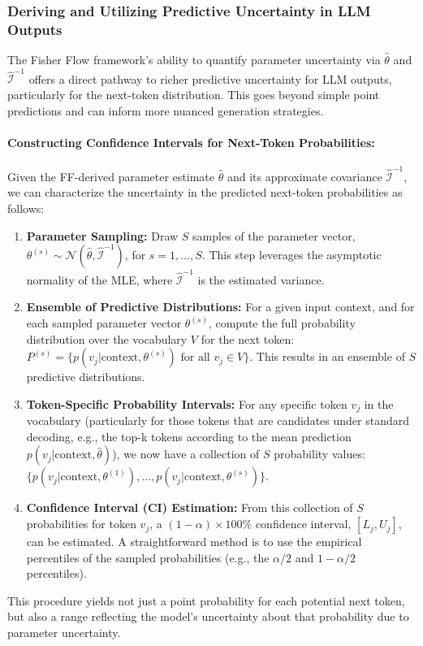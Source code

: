 \documentclass[11pt]{article}
\begin{document}
\subsubsection{Deriving and Utilizing Predictive Uncertainty in LLM Outputs}

The Fisher Flow framework's ability to quantify parameter uncertainty via $\hat{\theta}$ and $\hat{\mathcal{I}}^{-1}$ offers a direct pathway to richer predictive uncertainty for LLM outputs, particularly for the next-token distribution. This goes beyond simple point predictions and can inform more nuanced generation strategies.

\paragraph{Constructing Confidence Intervals for Next-Token Probabilities:}
Given the FF-derived parameter estimate $\hat{\theta}$ and its approximate covariance $\hat{\mathcal{I}}^{-1}$, we can characterize the uncertainty in the predicted next-token probabilities as follows:
\begin{enumerate}
    \item \textbf{Parameter Sampling:} Draw $S$ samples of the parameter vector, $\theta^{(s)} \sim \mathcal{N}(\hat{\theta}, \hat{\mathcal{I}}^{-1})$, for $s=1, \ldots, S$. This step leverages the asymptotic normality of the MLE, where $\hat{\mathcal{I}}^{-1}$ is the estimated variance.
    \item \textbf{Ensemble of Predictive Distributions:} For a given input context, and for each sampled parameter vector $\theta^{(s)}$, compute the full probability distribution over the vocabulary $V$ for the next token: $P^{(s)} = \{p(v_j | \text{context}, \theta^{(s)}) \text{ for all } v_j \in V\}$. This results in an ensemble of $S$ predictive distributions.
    \item \textbf{Token-Specific Probability Intervals:} For any specific token $v_j$ in the vocabulary (particularly for those tokens that are candidates under standard decoding, e.g., the top-k tokens according to the mean prediction $p(v_j | \text{context}, \hat{\theta})$), we now have a collection of $S$ probability values: $\{p(v_j | \text{context}, \theta^{(1)}), \ldots, p(v_j | \text{context}, \theta^{(s)}) \}$.
    \item \textbf{Confidence Interval (CI) Estimation:} From this collection of $S$ probabilities for token $v_j$, a $(1-\alpha) \times 100\%$ confidence interval, $[L_j, U_j]$, can be estimated. A straightforward method is to use the empirical percentiles of the sampled probabilities (e.g., the $\alpha/2$ and $1-\alpha/2$ percentiles).
\end{enumerate}
This procedure yields not just a point probability for each potential next token, but also a range reflecting the model's uncertainty about that probability due to parameter uncertainty.
\end{document}
